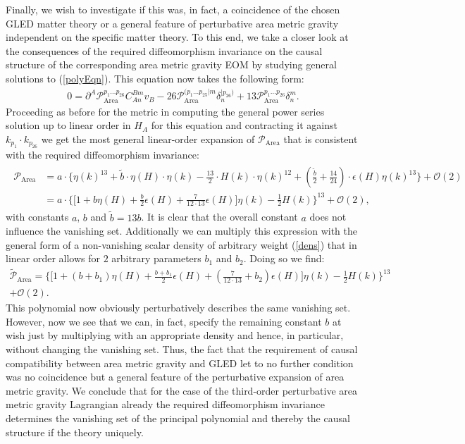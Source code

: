 Finally, we wish to investigate if this was, in fact, a coincidence of the chosen GLED matter theory or a general feature of perturbative area metric gravity independent on the specific matter theory. To this end, we take a closer look at the consequences of the required diffeomorphism invariance on the causal structure of the corresponding area metric gravity EOM by studying general solutions to (\ref{polyEqn}). This equation now takes the following form:
\begin{align}\label{AreaPolyEqn}
    0 = \partial^A \mathcal{P}_{\text{Area}}^{p_1...p_{26}} C_{An}^{Bm} v_B - 26\mathcal{P}_{\text{Area}}^{(p_1...p_{25}\vert m} \delta_n^{\vert p_{26})} + 13 \mathcal{P}_{\text{Area}}^{p_1...p_{26}} \delta^m_n.
\end{align}
Proceeding as before for the metric in computing the general power series solution up to linear order in $H_A$ for this equation and contracting it against $k_{p_1} \cdot k_{p_{26}}$ we get the most general linear-order expansion of $\mathcal{P}_{\text{Area}}$ that is consistent with the required diffeomorphism invariance:
\begin{align}
\begin{aligned}
    \mathcal{P}_{\text{Area}} &= a \cdot \bigl \{  \eta(k)^{13} + \tilde{b} \cdot \eta(H) \cdot \eta(k) - \frac{13}{2} \cdot  H(k) \cdot \eta(k)^{12} + (\frac{\tilde{b}}{2}+\frac{14}{24}) \cdot \epsilon(H) \eta(k)^{13}  \bigr \} + \mathcal{O}(2)\\
    &=a \cdot \bigl\{  \bigl[ 1 + b \eta(H) + \frac{b}{2} \epsilon(H) +  \frac{7}{12\cdot13} \epsilon(H) \bigr] \eta(k) - \frac{1}{2} H(k)       \bigr\}^{13} + \mathcal{O}(2),
\end{aligned}
\end{align}
with constants $a$, $b$ and $\tilde{b} = 13b$. It is clear that the overall constant $a$ does not influence the vanishing set. Additionally we can multiply this expression with the general form of a non-vanishing scalar density of arbitrary weight (\ref{dens}) that in linear order allows for $2$ arbitrary parameters $b_1$ and $b_2$. Doing so we find:
\begin{multline}
    \tilde{\mathcal{P}}_{\text{Area}} = \bigl\{  \bigl[ 1 + (b+ b_1) \eta(H) + \frac{b+b_1}{2} \epsilon(H) +  (\frac{7}{12\cdot13}+b_2) \epsilon(H) \bigr] \eta(k) - \frac{1}{2} H(k)       \bigr\}^{13} \\
    + \mathcal{O}(2).
\end{multline}
This polynomial now obviously perturbatively describes the same vanishing set. However, now we see that we can, in fact, specify the remaining constant $b$ at wish just by multiplying with an appropriate density and hence, in particular, without changing the vanishing set. 
Thus, the fact that the requirement of causal compatibility between area metric gravity and GLED let to no further condition was no coincidence but a general feature of the perturbative expansion of area metric gravity.
We conclude that for the case of the third-order perturbative area metric gravity Lagrangian already the required diffeomorphism invariance determines the vanishing set of the principal polynomial and thereby the causal structure if the theory uniquely. 


